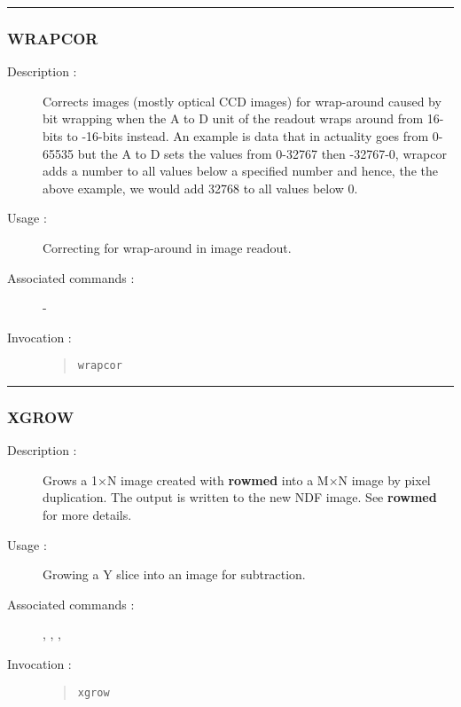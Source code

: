\hrule
\subsubsection*{\label{WRAPCOR}WRAPCOR}

\begin{description}

\item[Description :] Corrects images (mostly optical CCD images) for
wrap-around caused by bit wrapping when the A to D unit of the readout
wraps around from 16-bits to -16-bits instead.  An example is data that
in actuality goes from 0-65535 but the A to D sets the values from
0-32767 then -32767-0, wrapcor adds a number to all values below a
specified number and hence, the the above example, we would add 32768
to all values below 0.

\item[Usage :] Correcting for wrap-around in image readout.
\item[Associated commands :] -
\item[Invocation :]

\begin{quote}{\tt  wrapcor }\end{quote}

\end{description}

\hrule
\subsubsection*{\label{XGROW}XGROW}

\begin{description}

\item[Description :] Grows a 1$\times$N image created with {\bf rowmed}
into a M$\times$N image by pixel duplication.  The output is written to
the new NDF image.  See {\bf rowmed} for more details.

\item[Usage :] Growing a Y slice into an image for subtraction.

\item[Associated commands :] {\tt {}},
{\tt {}}, {\tt {}},
{\tt {}}

\item[Invocation :]

\begin{quote}{\tt xgrow }\end{quote}

\end{description}

